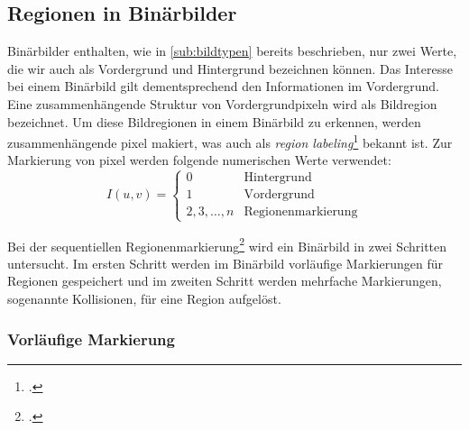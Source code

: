 \subsection{Regionen in Binärbilder} %
\label{sec:regionen_in_binärbilder}

Binärbilder enthalten, wie in \autoref{sub:bildtypen} bereits beschrieben, nur zwei Werte, die wir auch als Vordergrund
 und Hintergrund bezeichnen können. Das Interesse bei einem Binärbild gilt dementsprechend den Informationen im
 Vordergrund. Eine zusammenhängende Struktur von Vordergrundpixeln wird als Bildregion bezeichnet. Um diese
 Bildregionen in einem Binärbild zu erkennen, werden zusammenhängende \gls{pixel} makiert, was auch als
 \textit{region labeling}\footcite[Vgl.][S.~196]{burger05} bekannt ist. Zur Markierung von \gls{pixel} werden folgende
 numerischen Werte verwendet:
\begin{equation*}
	I(u,v) = \begin{cases}
	0 & \textrm{Hintergrund}\\
	1 & \textrm{Vordergrund}\\
	2,3,\ldots,n & \textrm{Regionenmarkierung}
	\end{cases}
\end{equation*}

Bei der sequentiellen Regionenmarkierung\footcite[Vgl.][S.~200--206]{burger05} wird ein Binärbild in zwei Schritten
 untersucht. Im ersten Schritt werden im Binärbild vorläufige Markierungen für Regionen gespeichert und im zweiten
 Schritt werden mehrfache Markierungen, sogenannte Kollisionen, für eine Region aufgelöst.

\subsubsection{Vorläufige Markierung} %
\label{sec:vorläufige_makierung}

